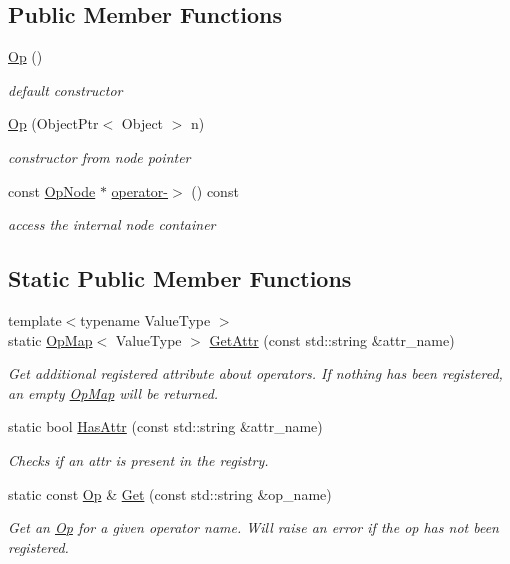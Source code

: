 \subsection*{Public Member Functions}
\begin{DoxyCompactItemize}
\item 
\hyperlink{classtvm_1_1Op_afde3bc925d4d4c7ea09d4da50fc32c66}{Op} ()
\begin{DoxyCompactList}\small\item\em default constructor \end{DoxyCompactList}\item 
\hyperlink{classtvm_1_1Op_abaafec14f5f05cc8bd3cdbf99eeb53d5}{Op} (Object\+Ptr$<$ Object $>$ n)
\begin{DoxyCompactList}\small\item\em constructor from node pointer \end{DoxyCompactList}\item 
const \hyperlink{classtvm_1_1OpNode}{Op\+Node} $\ast$ \hyperlink{classtvm_1_1Op_adecc41ad59962134dce22a8211ee19f2}{operator-\/$>$} () const 
\begin{DoxyCompactList}\small\item\em access the internal node container \end{DoxyCompactList}\end{DoxyCompactItemize}
\subsection*{Static Public Member Functions}
\begin{DoxyCompactItemize}
\item 
{\footnotesize template$<$typename Value\+Type $>$ }\\static \hyperlink{classtvm_1_1OpMap}{Op\+Map}$<$ Value\+Type $>$ \hyperlink{classtvm_1_1Op_ab1d0bfd024cedf156bf59cccfc29bd59}{Get\+Attr} (const std\+::string \&attr\+\_\+name)
\begin{DoxyCompactList}\small\item\em Get additional registered attribute about operators. If nothing has been registered, an empty \hyperlink{classtvm_1_1OpMap}{Op\+Map} will be returned. \end{DoxyCompactList}\item 
static bool \hyperlink{classtvm_1_1Op_a51002130d653fea8a25d4080a84037f6}{Has\+Attr} (const std\+::string \&attr\+\_\+name)
\begin{DoxyCompactList}\small\item\em Checks if an attr is present in the registry. \end{DoxyCompactList}\item 
static const \hyperlink{classtvm_1_1Op}{Op} \& \hyperlink{classtvm_1_1Op_a0d3633a44d1d1b210520b72056d1e449}{Get} (const std\+::string \&op\+\_\+name)
\begin{DoxyCompactList}\small\item\em Get an \hyperlink{classtvm_1_1Op}{Op} for a given operator name. Will raise an error if the op has not been registered. \end{DoxyCompactList}\end{DoxyCompactItemize}


